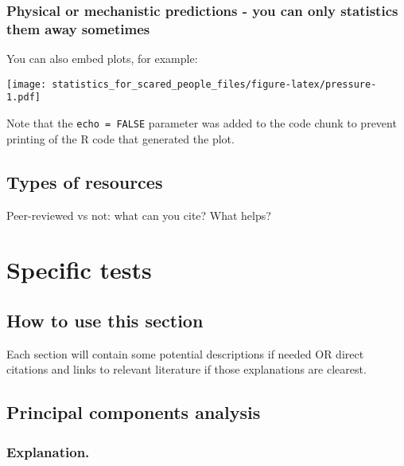 \documentclass[
]{book}
\begin{document}
\hypertarget{physical-or-mechanistic-predictions---you-can-only-statistics-them-away-sometimes}{%
\section{Physical or mechanistic predictions - you can only statistics them away sometimes}\label{physical-or-mechanistic-predictions---you-can-only-statistics-them-away-sometimes}}

You can also embed plots, for example:

\texttt{[image: statistics\_for\_scared\_people\_files/figure-latex/pressure-1.pdf]}

Note that the \texttt{echo\ =\ FALSE} parameter was added to the code chunk to prevent printing of the R code that generated the plot.

\hypertarget{types-of-resources}{%
\chapter{Types of resources}\label{types-of-resources}}

Peer-reviewed vs not: what can you cite?
What helps?

\hypertarget{part-specific-tests}{%
\part{Specific tests}\label{part-specific-tests}}

\hypertarget{how-to-use-this-section}{%
\chapter*{How to use this section}\label{how-to-use-this-section}}

Each section will contain some potential descriptions if needed OR direct citations and links to relevant literature if those explanations are clearest.

\hypertarget{principal-components-analysis}{%
\chapter*{Principal components analysis}\label{principal-components-analysis}}

\hypertarget{explanation.}{%
\section{Explanation.}\label{explanation.}}
\end{document}
